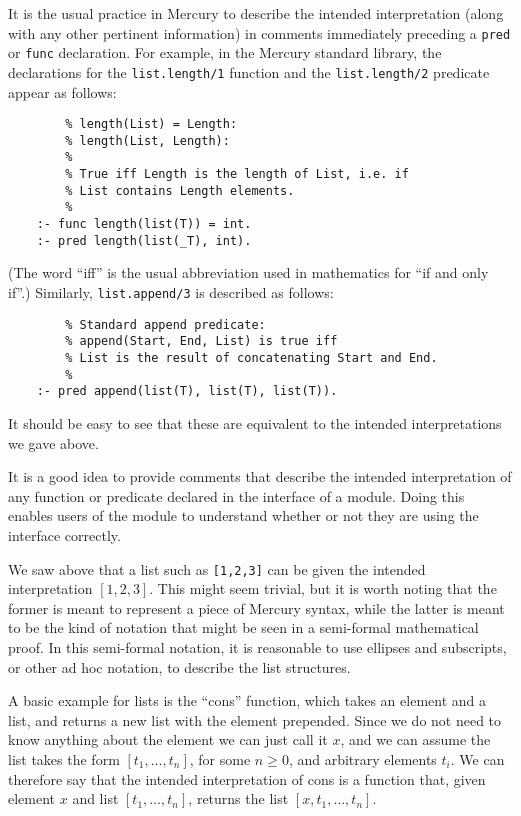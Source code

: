 It is the usual practice in Mercury
to describe the intended interpretation
(along with any other pertinent information)
in comments immediately preceding
a \texttt{pred} or \texttt{func} declaration.
For example,
in the Mercury standard library,
the declarations for the \texttt{list.length/1} function
and the \texttt{list.length/2} predicate
appear as follows:
\begin{verbatim}
        % length(List) = Length:
        % length(List, Length):
        %
        % True iff Length is the length of List, i.e. if
        % List contains Length elements.
        %
    :- func length(list(T)) = int.
    :- pred length(list(_T), int).
\end{verbatim}
(The word ``iff'' is the usual abbreviation used in mathematics
for ``if and only if''.)
Similarly, \texttt{list.append/3} is described as follows:
\begin{verbatim}
        % Standard append predicate:
        % append(Start, End, List) is true iff
        % List is the result of concatenating Start and End.
        %
    :- pred append(list(T), list(T), list(T)).
\end{verbatim}
It should be easy to see that
these are equivalent to the intended interpretations we gave above.

It is a good idea to provide comments
that describe the intended interpretation
of any function or predicate
declared in the interface of a module.
Doing this enables users of the module
to understand whether or not they are
using the interface correctly.

We saw above that a list such as \texttt{[1,2,3]}
can be given the intended interpretation $[1, 2, 3]$.
This might seem trivial,
but it is worth noting that
the former is meant to represent a piece of Mercury syntax,
while the latter is meant to be the kind of notation
that might be seen in a semi-formal mathematical proof.
In this semi-formal notation, it is reasonable to use ellipses and subscripts,
or other ad hoc notation,
to describe the list structures.

A basic example for lists is the ``cons'' function,
which takes an element and a list,
and returns a new list with the element prepended.
Since we do not need to know anything about the element
we can just call it $x$,
and we can assume the list takes the form $[t_1, \ldots, t_n]$,
for some $n \geqslant 0$, and arbitrary elements $t_i$.
We can therefore say that
the intended interpretation of cons is a function that,
given element $x$ and list $[t_1, \ldots, t_n]$,
returns the list $[x, t_1, \ldots, t_n]$.

